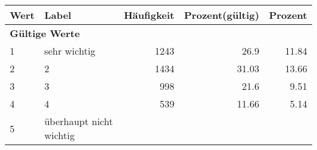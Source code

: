      \begin{longtable}{lXrrr}
     \toprule
     \textbf{Wert} & \textbf{Label} & \textbf{Häufigkeit} & \textbf{Prozent(gültig)} & \textbf{Prozent} \\
     \endhead
     \midrule
     \multicolumn{5}{l}{\textbf{Gültige Werte}}\\

     1 &
     \multicolumn{1}{X}{ sehr wichtig   } &


       \num{1243} &
       \num[round-mode=places,round-precision=2]{26.9} &
         \num[round-mode=places,round-precision=2]{11.84} \\

     2 &
     \multicolumn{1}{X}{ 2   } &


       \num{1434} &
       \num[round-mode=places,round-precision=2]{31.03} &
         \num[round-mode=places,round-precision=2]{13.66} \\

     3 &
     \multicolumn{1}{X}{ 3   } &


       \num{998} &
       \num[round-mode=places,round-precision=2]{21.6} &
         \num[round-mode=places,round-precision=2]{9.51} \\

     4 &
     \multicolumn{1}{X}{ 4   } &


       \num{539} &
       \num[round-mode=places,round-precision=2]{11.66} &
         \num[round-mode=places,round-precision=2]{5.14} \\

     5 &
     \multicolumn{1}{X}{ überhaupt nicht wichtig   } &



\end{longtable}
